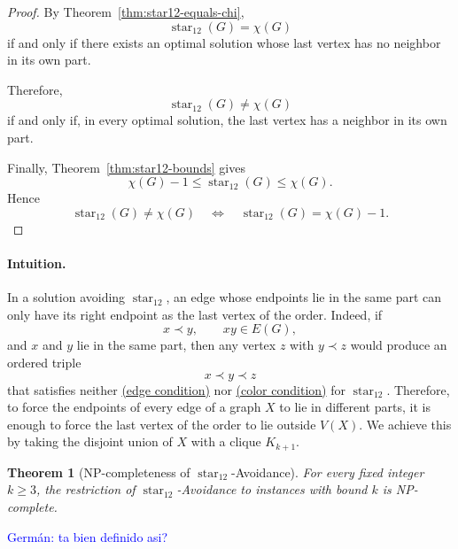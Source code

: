 \documentclass[12pt]{article}
\theoremstyle{plain}
\newtheorem{theorem}{Theorem}[section]
\theoremstyle{definition}
\theoremstyle{remark}
\theoremstyle{definition}
\newcommand{\edgecondition}{%
  \hyperref[def:avoid:cond:edge]{(edge condition)}\xspace
}
\newcommand{\colorcondition}{%
  \hyperref[def:avoid:cond:color]{(color condition)}\xspace
}
\newcommand{\starlabel}{\mathrm{star}}
\DeclareRobustCommand{\starparam}[1]{%
  \ensuremath{\mathop{\starlabel}\nolimits_{#1}}%
}
\newcommand{\german}[1]{%
  \textcolor{blue}{Germán: #1}%
}
\begin{document}
\begin{proof}
By Theorem~\ref{thm:star12-equals-chi},
\[
\starparam{12}(G)=\chi(G)
\]
if and only if there exists an optimal solution whose last vertex has no
neighbor in its own part.

Therefore,
\[
\starparam{12}(G)\neq\chi(G)
\]
if and only if, in every optimal solution, the last vertex has a neighbor
in its own part.

Finally, Theorem~\ref{thm:star12-bounds} gives
\[
\chi(G)-1
\le
\starparam{12}(G)
\le
\chi(G).
\]
Hence
\[
\starparam{12}(G)\neq\chi(G)
\quad\Longleftrightarrow\quad
\starparam{12}(G)=\chi(G)-1.
\]

\end{proof}







\paragraph{Intuition.}
In a solution avoiding \(\operatorname{star}_{12}\), an edge whose endpoints lie in the same part can only have its
right endpoint as the last vertex of the order. Indeed, if
\[
x\prec y,\qquad xy\in E(G),
\]
and \(x\) and \(y\) lie in the same part, then any vertex \(z\) with \(y\prec z\) would produce an ordered triple
\[
x\prec y\prec z
\]
that satisfies neither \edgecondition{} nor \colorcondition{} for \(\operatorname{star}_{12}\).
Therefore, to force the endpoints of every edge of a graph \(X\) to lie in different parts, it is enough to force
the last vertex of the order to lie outside \(V(X)\). We achieve this by taking the disjoint union of \(X\) with
a clique \(K_{k+1}\). 


\begin{theorem}[NP-completeness of \(\starparam{12}\)-Avoidance]
\label{thm:star12-np-complete}
For every fixed integer \(k\ge 3\), the restriction of
\(\starparam{12}\)-Avoidance to instances with bound \(k\) is NP-complete.
\end{theorem}
\german{ta bien definido asi?}
\end{document}
